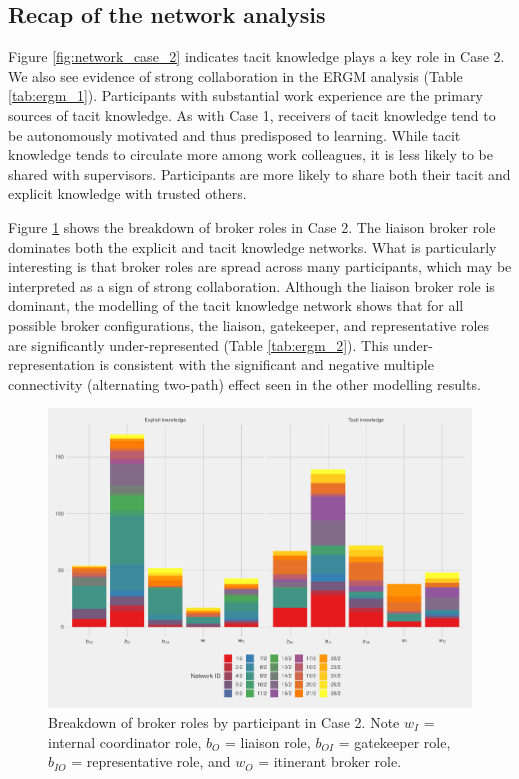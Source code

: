 \subsection{Recap of the network analysis}

Figure \ref{fig:network_case_2} indicates tacit knowledge plays a key role in Case 2. We also see evidence of strong collaboration in the ERGM analysis (Table \ref{tab:ergm_1}). Participants with substantial work experience are the primary sources of tacit knowledge. As with Case 1, receivers of tacit knowledge tend to be autonomously motivated and thus predisposed to learning. While tacit knowledge tends to circulate more among work colleagues, it is less likely to be shared with supervisors. Participants are more likely to share both their tacit and explicit knowledge with trusted others. \medskip

Figure \ref{fig:gf_c2} shows the breakdown of broker roles in Case 2. The liaison broker role dominates both the explicit and tacit knowledge networks. What is particularly interesting is that broker roles are spread across many participants, which may be interpreted as a sign of strong collaboration. Although the liaison broker role is dominant, the modelling of the tacit knowledge network shows that for all possible broker configurations, the liaison, gatekeeper, and representative roles are significantly under-represented (Table \ref{tab:ergm_2}). This under-representation is consistent with the significant and negative multiple connectivity (alternating two-path) effect seen in the other modelling results.

\begin{figure}
\centering
\includegraphics[width = \textwidth]{Images/gf_case2.pdf}
\caption[Breakdown of broker roles by participant in Case 2]{Breakdown of broker roles by participant in Case 2. Note $w_I$ = internal coordinator role, $b_O$ = liaison role, $b_{OI}$ = gatekeeper role, $b_{IO}$ = representative role, and $w_O$ = itinerant broker role.}
\label{fig:gf_c2}
\end{figure}

